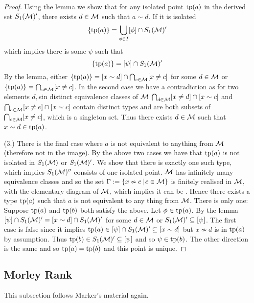\begin{proof}
    Using the lemma we show that for any isolated point 
    $\operatorname{tp}(a)$ in the derived set $S_1(\mathcal{M})'$,
    there exists $d \in \mathcal{M}$ such that $a \sim d$.
    If it is isolated
    \[\left\{\operatorname{tp}(a)\right\} = \bigcup_{\phi \in I} [\phi] \cap S_1(\mathcal{M})'\] 
    which implies 
    there is some $\psi$ such that 
    \[  
        \left\{\operatorname{tp}(a)\right\} = [\psi] \cap S_1(\mathcal{M})'
    \]
    By the lemma, either $\left\{\operatorname{tp}(a)\right\} = [x \sim d] 
    \cap \bigcap_{c \in \mathcal{M}} [x \ne c]$ for some $d \in \mathcal{M}$ or 
    $\left\{\operatorname{tp}(a)\right\} = \bigcap_{c \in \mathcal{M}} [x \ne c]$.
    In the second case we have a contradiction as for two elements $d, e$in 
    distinct equivalence classes of $\mathcal{M}$
    $\bigcap_{d \in \mathcal{M}} [x \ne d] \cap [x \sim c]$ and 
    $\bigcap_{e \in \mathcal{M}} [x \ne e] \cap [x \sim c]$ contain distinct types
    and are both subsets of $\bigcap_{c \in \mathcal{M}} [x \ne c]$, 
    which is a singleton set.
    Thus there exists $d \in \mathcal{M}$ such that $x \sim d \in \operatorname{tp}(a)$.

    (3.) There is the final case where $a$ is 
    not equivalent to anything from $\mathcal{M}$ (therefore not in the image). 
    By the above two cases 
    we have that $\operatorname{tp}(a)$ is not isolated in $S_1(\mathcal{M})$ or $S_1(\mathcal{M})'$.
    We show that there is exactly one such type, 
    which implies $S_1(\mathcal{M})''$ consists of one isolated point.
    $\mathcal{M}$ has infinitely many equivalence classes 
    and so the set $\Gamma := \left\{ x \nsim c \,|\, c \in \mathcal{M}\right\}$ is finitely 
    realised in $\mathcal{M}$, 
    with the elementary diagram of $\mathcal{M}$, 
    which implies it can be 
    .
    Hence there exists a type $\operatorname{tp}(a)$ such that 
    $a$ is not equivalent to any thing from $\mathcal{M}$.
    There is only one:
    Suppose $\operatorname{tp}(a)$ and $\operatorname{tp}(b)$ both satisfy the above.
    Let $\phi \in \operatorname{tp}(a)$.
    By the lemma $[\psi] \cap S_1(\mathcal{M})' = [x \sim d] \cap S_1(\mathcal{M})'$ 
    for some $d \in \mathcal{M}$
    or $S_1(\mathcal{M})' \subseteq [\psi]$.
    The first case is false since it implies 
    $\operatorname{tp}(a) \in [\psi] \cap S_1(\mathcal{M})' \subseteq [x \sim d]$ 
    but $x \nsim d$ is in $\operatorname{tp}(a)$ by assumption.
    Thus $\operatorname{tp}(b) \in S_1(\mathcal{M})' \subseteq [\psi]$ and so $\psi \in \operatorname{tp}(b)$.
    The other direction is the same and so $\operatorname{tp}(a) = \operatorname{tp}(b)$ and 
    this point is unique.
\end{proof}

\subsection{Morley Rank}
This subsection follows Marker's \cite{marker} material again.

